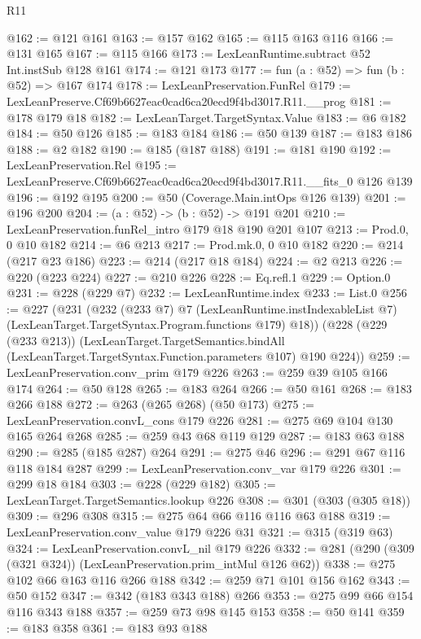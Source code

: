 \begin{lexlean}{R11}
\begin{coremodule}
@162 := @121 @161
@163 := @157 @162
@165 := @115 @163 @116
@166 := @131 @165
@167 := @115 @166
@173 := LexLeanRuntime.subtract @52 Int.instSub @128 @161
@174 := @121 @173
@177 := fun (a : @52) => fun (b : @52) => @167 @174
@178 := LexLeanPreservation.FunRel
@179 := LexLeanPreserve.Cf69b6627eac0cad6ca20ecd9f4bd3017.R11.__prog
@181 := @178 @179 @18
@182 := LexLeanTarget.TargetSyntax.Value
@183 := @6 @182
@184 := @50 @126
@185 := @183 @184
@186 := @50 @139
@187 := @183 @186
@188 := @2 @182
@190 := @185 (@187 @188)
@191 := @181 @190
@192 := LexLeanPreservation.Rel
@195 := LexLeanPreserve.Cf69b6627eac0cad6ca20ecd9f4bd3017.R11.__fits_0 @126 @139
@196 := @192 @195
@200 := @50 (Coverage.Main.intOps @126 @139)
@201 := @196 @200
@204 := (a : @52) -> (b : @52) -> @191 @201
@210 := LexLeanPreservation.funRel_intro @179 @18 @190 @201 @107
@213 := Prod.{0, 0} @10 @182
@214 := @6 @213
@217 := Prod.mk.{0, 0} @10 @182
@220 := @214 (@217 @23 @186)
@223 := @214 (@217 @18 @184)
@224 := @2 @213
@226 := @220 (@223 @224)
@227 := @210 @226
@228 := Eq.refl.{1}
@229 := Option.{0}
@231 := @228 (@229 @7)
@232 := LexLeanRuntime.index
@233 := List.{0}
@256 := @227
    (@231
      (@232
        (@233 @7)
        @7
        (LexLeanRuntime.instIndexableList @7)
        (LexLeanTarget.TargetSyntax.Program.functions @179)
        @18))
    (@228
      (@229 (@233 @213))
      (LexLeanTarget.TargetSemantics.bindAll
        (LexLeanTarget.TargetSyntax.Function.parameters @107)
        @190
        @224))
@259 := LexLeanPreservation.conv_prim @179 @226
@263 := @259 @39 @105 @166 @174
@264 := @50 @128
@265 := @183 @264
@266 := @50 @161
@268 := @183 @266 @188
@272 := @263 (@265 @268) (@50 @173)
@275 := LexLeanPreservation.convL_cons @179 @226
@281 := @275 @69 @104 @130 @165 @264 @268
@285 := @259 @43 @68 @119 @129
@287 := @183 @63 @188
@290 := @285 (@185 @287) @264
@291 := @275 @46
@296 := @291 @67 @116 @118 @184 @287
@299 := LexLeanPreservation.conv_var @179 @226
@301 := @299 @18 @184
@303 := @228 (@229 @182)
@305 := LexLeanTarget.TargetSemantics.lookup @226
@308 := @301 (@303 (@305 @18))
@309 := @296 @308
@315 := @275 @64 @66 @116 @116 @63 @188
@319 := LexLeanPreservation.conv_value @179 @226 @31
@321 := @315 (@319 @63)
@324 := LexLeanPreservation.convL_nil @179 @226
@332 := @281 (@290 (@309 (@321 @324)) (LexLeanPreservation.prim_intMul @126 @62))
@338 := @275 @102 @66 @163 @116 @266 @188
@342 := @259 @71 @101 @156 @162
@343 := @50 @152
@347 := @342 (@183 @343 @188) @266
@353 := @275 @99 @66 @154 @116 @343 @188
@357 := @259 @73 @98 @145 @153
@358 := @50 @141
@359 := @183 @358
@361 := @183 @93 @188

\end{coremodule}
\end{lexlean}

